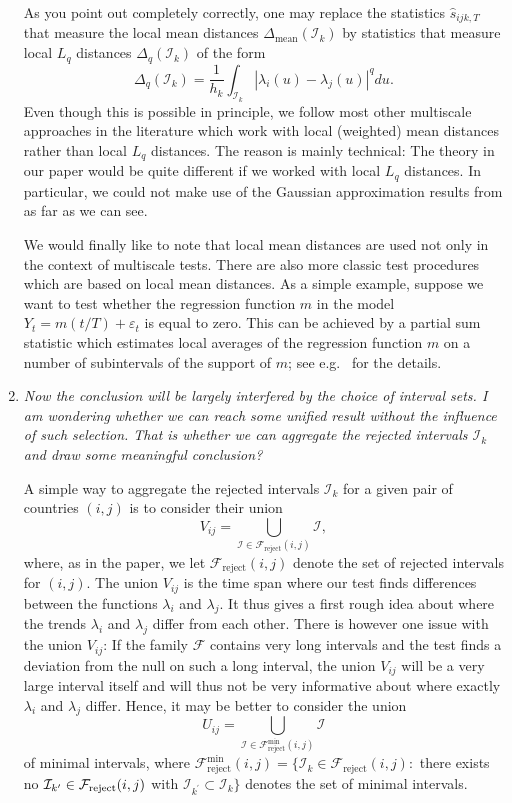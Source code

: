 \documentclass[a4paper,12pt]{article}
\begin{document}
\begin{enumerate}[label=(\arabic*),leftmargin=0.7cm]
As you point out completely correctly, one may replace the statistics $\hat{s}_{ijk,T}$ that measure the local mean distances $\Delta_{\text{mean}}(\mathcal{I}_k)$ by statistics that measure local $L_q$ distances $\Delta_q(\mathcal{I}_k)$ of the form 
\[ \Delta_q(\mathcal{I}_k) = \frac{1}{h_k} \int_{\mathcal{I}_k} |\lambda_i(u) - \lambda_j(u)|^q du. \]
Even though this is possible in principle, we follow most other multiscale approaches in the literature which work with local (weighted) mean distances rather than local $L_q$ distances. The reason is mainly technical: The theory in our paper would be quite different if we worked with local $L_q$ distances. In particular, we could not make use of the Gaussian approximation results from \cite{Chernozhukov2017} as far as we can see. 

We would finally like to note that local mean distances are used not only in the context of multiscale tests. There are also more classic test procedures which are based on local mean distances. As a simple example, suppose we want to test whether the regression function $m$ in the model $Y_t = m(t/T) + \varepsilon_t$ is equal to zero. This can be achieved by a partial sum statistic which estimates local averages of the regression function $m$ on a number of subintervals of the support of $m$; see e.g.\ \cite{Stute1997} for the details. 


\item \textit{Now the conclusion will be largely interfered by the choice of interval sets. I am wondering whether we can reach some unified result without the influence of such selection. That is whether we can aggregate the rejected intervals $\mathcal{I}_k$ and draw some meaningful conclusion?}

A simple way to aggregate the rejected intervals $\mathcal{I}_k$ for a given pair of countries $(i,j)$ is to consider their union
\[ V_{ij} = \bigcup_{\mathcal{I} \in \mathcal{F}_{\text{reject}}(i,j)} \mathcal{I}, \]
where, as in the paper, we let $\mathcal{F}_{\text{reject}}(i,j)$ denote the set of rejected intervals for $(i,j)$. The union $V_{ij}$ is the time span where our test finds differences between the functions $\lambda_i$ and $\lambda_j$. It thus gives a first rough idea about where the trends $\lambda_i$ and $\lambda_j$ differ from each other. There is however one issue with the union $V_{ij}$: If the family $\mathcal{F}$ contains very long intervals and the test finds a deviation from the null on such a long interval, the union $V_{ij}$ will be a very large interval itself and will thus not be very informative about where exactly $\lambda_i$ and $\lambda_j$ differ. Hence, %
it may be better to consider the union 
\[ U_{ij} = \bigcup_{\mathcal{I} \in \mathcal{F}_{\text{reject}}^{\min}(i,j)} \mathcal{I} \]
of minimal intervals, where $\mathcal{F}_{\text{reject}}^{\text{min}}(i,j) = \{ \mathcal{I}_k \in \mathcal{F}_{\text{reject}}(i,j):$  there exists no $\mathcal{I}_{k^\prime} \in \mathcal{F}_{\text{reject}}(i,j)$ with $\mathcal{I}_{k^\prime} \subset \mathcal{I}_k \}$ denotes the set of minimal intervals. 


\end{enumerate}
\end{document}
